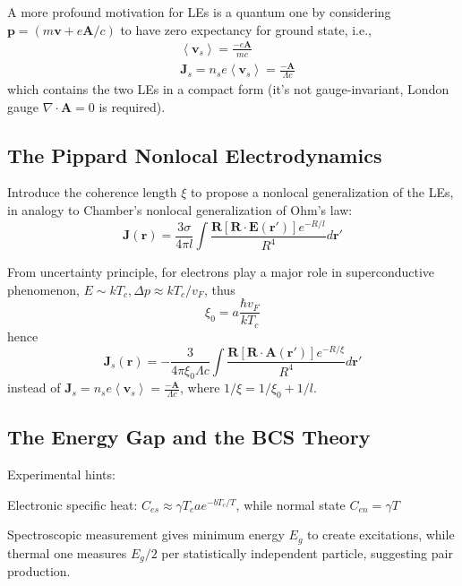 \documentclass[8pt,a4paper,twocolumn]{article} %
\numberwithin{equation}{section} %
\begin{document}
			A more profound motivation for LEs is a quantum one by considering $\bm p = (m \bm v+e \bm A/c)$ to have zero expectancy for ground state, i.e.,
			\begin{align}
				&\left< \bm v_s \right>=\frac{-e \bm A}{mc}\\
				&\bm J_s = n_s e\left< \bm v_s \right>=\frac{-\bm A}{\Lambda c}
			\end{align}
			which contains the two LEs in a compact form (it's not gauge-invariant, London gauge $ \nabla\cdot\bm A=0 $ is required).

		\subsection{The Pippard Nonlocal Electrodynamics} %
		\label{sub:the_pipard_nonlocal_electrodynamics}
			Introduce the coherence length $ \xi $ to propose a nonlocal generalization of the LEs, in analogy to Chamber's nonlocal generalization of Ohm's law:
			\begin{equation*}
				\bm J(\bm r)=\frac{3 \sigma}{4 \pi l}\int \frac{\bm R[\bm R\cdot \bm E (\bm r')] e^{-R/l}}{R^4}d\bm r'
			\end{equation*}

			From uncertainty principle, for electrons play a major role in superconductive phenomenon, $E\sim kT_c, \Delta p\approx kT_c/v_F$, thus
			\begin{equation}
				\xi_0 = a \frac{\hbar v_F}{kT_c}
			\end{equation}
			hence
			\begin{equation}
				\bm J_s(\bm r)=-\frac{3 }{4 \pi \xi_0 \Lambda c}\int \frac{\bm R[\bm R\cdot \bm A (\bm r')] e^{-R/\xi}}{R^4}d\bm r'
			\end{equation}
			instead of $ \bm J_s = n_s e\left< \bm v_s \right>=\frac{-\bm A}{\Lambda c} $, where $ 1/\xi = 1/\xi_0 + 1/l $.

		\subsection{The Energy Gap and the BCS Theory} %
		\label{sub:the_energy_gap_and_the_bcs_theory}
			Experimental hints:

			Electronic specific heat: $C_{es}\approx \gamma T_c a e^{-bT_c/T} $, while normal state $C_{en}=\gamma T $

			Spectroscopic measurement gives minimum energy $E_g$ to create excitations, while thermal one measures $E_g/2$ per statistically independent particle, suggesting pair production.
\end{document}
